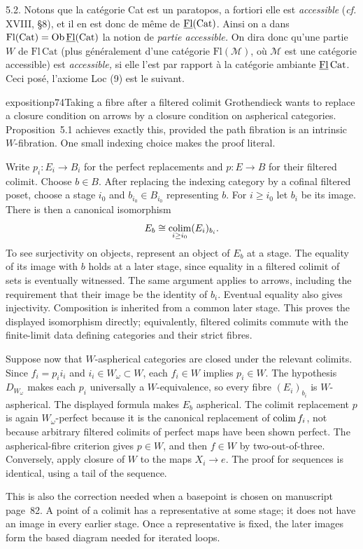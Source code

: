5.2. Notons que la catégorie Cat est un paratopos, a fortiori elle est \textit{accessible} (\textit{cf.} XVIII, §8), et il en est donc de même de $\underline{\mathrm{Fl}}(\mathrm{Cat})$. Ainsi on a dans $\mathrm{Fl}(\mathrm{Cat}) = \mathrm{Ob}\,\underline{\mathrm{Fl}}(\mathrm{Cat})$ la notion de \textit{partie accessible.} On dira donc qu'une partie $W$ de $\mathrm{Fl}\,\mathrm{Cat}$ (plus généralement d'une catégorie $\mathrm{Fl}(\mathcal{M})$, où $\mathcal{M}$ est une catégorie accessible) est \textit{accessible,} si elle l'est par rapport à la catégorie ambiante
$\underline{\mathrm{Fl}}\,\mathrm{Cat}$. Ceci posé, l'axiome Loc (9) est le suivant.

\begin{dcomment}{exposition}{p74}{Taking a fibre after a filtered colimit}
Grothendieck wants to replace a closure condition on arrows by a closure condition on aspherical categories. Proposition~5.1 achieves exactly this, provided the path fibration is an intrinsic $W$-fibration. One small indexing choice makes the proof literal.

Write $p_i:E_i\to B_i$ for the perfect replacements and $p:E\to B$ for their filtered colimit. Choose $b\in B$. After replacing the indexing category by a cofinal filtered poset, choose a stage $i_0$ and $b_{i_0}\in B_{i_0}$ representing $b$. For $i\geq i_0$ let $b_i$ be its image. There is then a canonical isomorphism
\[
 E_b\cong\mathop{\rm colim}_{i\geq i_0}(E_i)_{b_i}.
\]
To see surjectivity on objects, represent an object of $E_b$ at a stage. The equality of its image with $b$ holds at a later stage, since equality in a filtered colimit of sets is eventually witnessed. The same argument applies to arrows, including the requirement that their image be the identity of $b_i$. Eventual equality also gives injectivity. Composition is inherited from a common later stage. This proves the displayed isomorphism directly; equivalently, filtered colimits commute with the finite-limit data defining categories and their strict fibres.

Suppose now that $W$-aspherical categories are closed under the relevant colimits. Since $f_i=p_i i_i$ and $i_i\in W_\omega\subset W$, each $f_i\in W$ implies $p_i\in W$. The hypothesis $D_{W_\omega}$ makes each $p_i$ universally a $W$-equivalence, so every fibre $(E_i)_{b_i}$ is $W$-aspherical. The displayed formula makes $E_b$ aspherical. The colimit replacement $p$ is again $W_\omega$-perfect because it is the canonical replacement of $\mathop{\rm colim}f_i$, not because arbitrary filtered colimits of perfect maps have been shown perfect. The aspherical-fibre criterion gives $p\in W$, and then $f\in W$ by two-out-of-three. Conversely, apply closure of $W$ to the maps $X_i\to e$. The proof for sequences is identical, using a tail of the sequence.

This is also the correction needed when a basepoint is chosen on manuscript page~82. A point of a colimit has a representative at some stage; it does not have an image in every earlier stage. Once a representative is fixed, the later images form the based diagram needed for iterated loops.
\end{dcomment}


